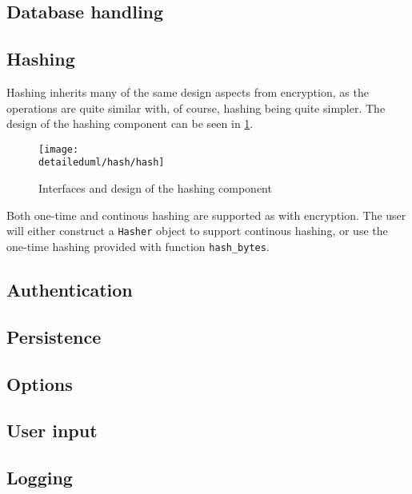 \subsection{Database handling}
\subsection{Hashing}

Hashing inherits many of the same design aspects from encryption, as the
operations are quite similar with, of course, hashing being quite simpler.
The design of the hashing component can be seen in \ref{dia:hash_design}.

\begin{figure}[H]
    \centering
    \centerline{\texttt{[image: \\detaileduml/hash/hash]}}
    \caption{Interfaces and design of the hashing component}
    \label{dia:hash_design}
\end{figure}

Both one-time and continous hashing are supported as with encryption. The user
will either construct a \texttt{Hasher} object to support continous hashing, or
use the one-time hashing provided with function \texttt{hash\_bytes}.

\subsection{Authentication}
\subsection{Persistence}
\subsection{Options}
\subsection{User input}
\subsection{Logging}
